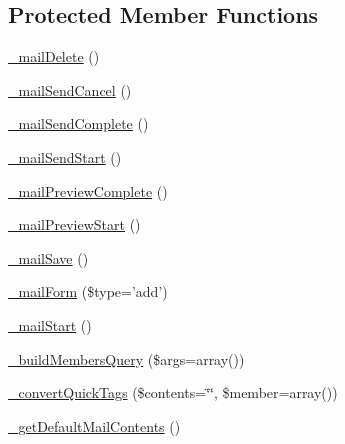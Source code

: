 \subsection*{Protected Member Functions}
\begin{DoxyCompactItemize}
\item 
\hyperlink{classadmin__members__bulkmail__bulkmail_a16a9acfe4fa492921c2475d77770ba0c}{\-\_\-mail\-Delete} ()
\item 
\hyperlink{classadmin__members__bulkmail__bulkmail_a3a5c24eb9f974b6484cc153c7c5bc890}{\-\_\-mail\-Send\-Cancel} ()
\item 
\hyperlink{classadmin__members__bulkmail__bulkmail_a29e224cebe852ed526195c8b2dc3ca1e}{\-\_\-mail\-Send\-Complete} ()
\item 
\hyperlink{classadmin__members__bulkmail__bulkmail_a81293caad826ce3e3fcc6b69b5249254}{\-\_\-mail\-Send\-Start} ()
\item 
\hyperlink{classadmin__members__bulkmail__bulkmail_ad182427c6f821cba9d9e0d36e6dc0368}{\-\_\-mail\-Preview\-Complete} ()
\item 
\hyperlink{classadmin__members__bulkmail__bulkmail_a36e64f2395e32ea725bf0c805d9ef406}{\-\_\-mail\-Preview\-Start} ()
\item 
\hyperlink{classadmin__members__bulkmail__bulkmail_af9e5291a88a1ee1d6bf570296f1adb94}{\-\_\-mail\-Save} ()
\item 
\hyperlink{classadmin__members__bulkmail__bulkmail_a6a52e6f0e945d4706aae30ec25cbf0b8}{\-\_\-mail\-Form} (\$type='add')
\item 
\hyperlink{classadmin__members__bulkmail__bulkmail_a0eec73e6ce7a24c85c9a1643a35de61a}{\-\_\-mail\-Start} ()
\item 
\hyperlink{classadmin__members__bulkmail__bulkmail_a23a41c91c1f2b62258235a5671b2a48a}{\-\_\-build\-Members\-Query} (\$args=array())
\item 
\hyperlink{classadmin__members__bulkmail__bulkmail_acd215eab5f13ce75d8694052041b5ebe}{\-\_\-convert\-Quick\-Tags} (\$contents=\char`\"{}\char`\"{}, \$member=array())
\item 
\hyperlink{classadmin__members__bulkmail__bulkmail_afe8683bbe0c4289e19c338dc59e09810}{\-\_\-get\-Default\-Mail\-Contents} ()
\end{DoxyCompactItemize}

